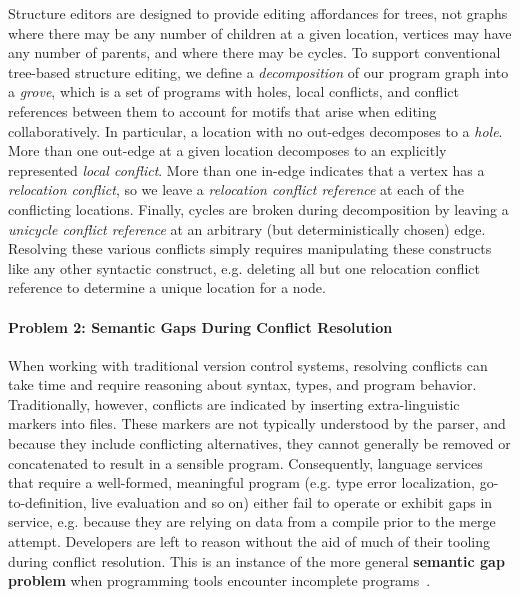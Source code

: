 Structure editors are designed to provide editing affordances for trees, not graphs where there may be any number of children at a given location, vertices may have any number of parents, and where there may be cycles. 
To support conventional tree-based structure editing, 
we define a \emph{decomposition} of our program graph into a \emph{grove}, which is a set of 
programs with holes, local conflicts, and conflict references between them to account for motifs that arise when editing collaboratively. 
In particular, a location with no out-edges decomposes to a \emph{hole}. 
More than one out-edge at a given location decomposes to an explicitly represented \emph{local conflict}. 
More than one in-edge indicates that a vertex has a \emph{relocation conflict}, so we leave a \emph{relocation conflict reference} at each of the conflicting locations. 
Finally, cycles are broken during decomposition by leaving a \emph{unicycle conflict reference} at an arbitrary (but deterministically chosen) edge. 
Resolving these various conflicts simply requires 
manipulating these constructs like any other syntactic construct, e.g. deleting all but one relocation conflict reference to determine a unique location for a node. 

\paragraph{Problem 2: Semantic Gaps During Conflict Resolution}
When working with traditional version control systems,
resolving conflicts can take time and require reasoning about 
syntax, types, and program behavior.
Traditionally, however, conflicts are indicated by inserting extra-linguistic markers
into files. 
These markers are not typically understood by the parser, and 
because they include conflicting alternatives, they cannot generally be removed 
or concatenated to result in a sensible program. 
Consequently, language services that require a well-formed, meaningful program
(e.g. type error localization, go-to-definition, live evaluation and so on) 
either fail to operate or exhibit gaps in service, e.g. because they are relying on 
data from a compile prior to the merge attempt. Developers are left to reason without the aid of much of their tooling during conflict resolution. This is an instance of the more general \textbf{semantic gap problem} when programming tools encounter incomplete programs~\cite{DBLP:conf/snapl/OmarVHSGAH17}. 

